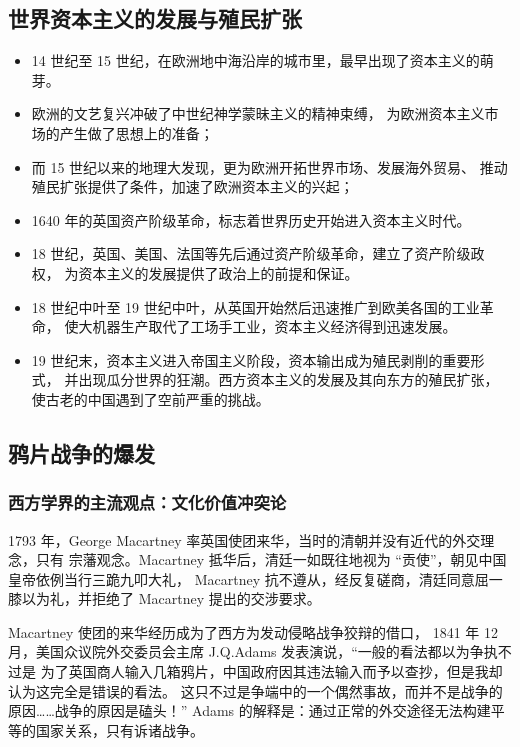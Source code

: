 \documentclass[10pt, UTF8]{book} %
\begin{document}
\subsection{世界资本主义的发展与殖民扩张}

\begin{itemize}[itemsep=0pt]
    \item 14 世纪至 15 世纪，在欧洲地中海沿岸的城市里，最早出现了资本主义的萌芽。
    \item 欧洲的文艺复兴冲破了中世纪神学蒙昧主义的精神束缚，
    为欧洲资本主义市场的产生做了思想上的准备；
    \item 而 15 世纪以来的地理大发现，更为欧洲开拓世界市场、发展海外贸易、
    推动殖民扩张提供了条件，加速了欧洲资本主义的兴起；
    \item 1640 年的英国资产阶级革命，标志着世界历史开始进入资本主义时代。
    \item 18 世纪，英国、美国、法国等先后通过资产阶级革命，建立了资产阶级政权，
    为资本主义的发展提供了政治上的前提和保证。
    \item 18 世纪中叶至 19 世纪中叶，从英国开始然后迅速推广到欧美各国的工业革命，
    使大机器生产取代了工场手工业，资本主义经济得到迅速发展。
    \item 19 世纪末，资本主义进入帝国主义阶段，资本输出成为殖民剥削的重要形式，
    并出现瓜分世界的狂潮。西方资本主义的发展及其向东方的殖民扩张，
    使古老的中国遇到了空前严重的挑战。
\end{itemize}

\subsection{鸦片战争的爆发}

\subsubsection{西方学界的主流观点：文化价值冲突论}

1793 年，George Macartney 率英国使团来华，当时的清朝并没有近代的外交理念，只有
宗藩观念。Macartney 抵华后，清廷一如既往地视为 “贡使”，朝见中国皇帝依例当行三跪九叩大礼，
Macartney 抗不遵从，经反复磋商，清廷同意屈一膝以为礼，并拒绝了 Macartney 提出的交涉要求。

Macartney 使团的来华经历成为了西方为发动侵略战争狡辩的借口，
1841 年 12 月，美国众议院外交委员会主席 J.Q.Adams 发表演说，“一般的看法都以为争执不过是
为了英国商人输入几箱鸦片，中国政府因其违法输入而予以查抄，但是我却认为这完全是错误的看法。
这只不过是争端中的一个偶然事故，而并不是战争的原因……战争的原因是磕头！”
Adams 的解释是：通过正常的外交途径无法构建平等的国家关系，只有诉诸战争。\cite{两岸晚清}
\end{document}

